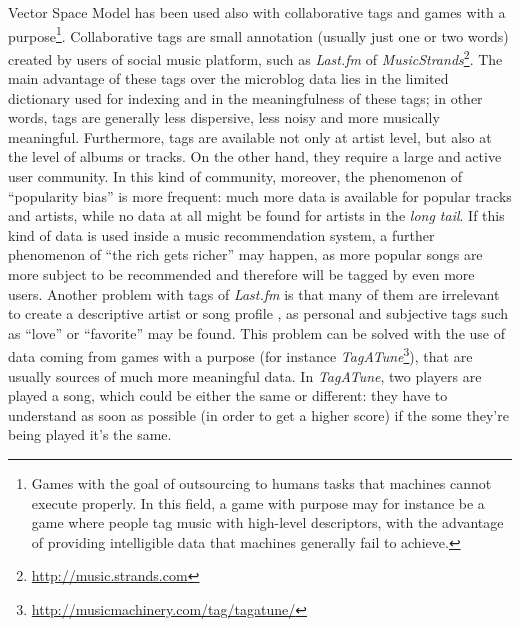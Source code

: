 Vector Space Model has been used also with collaborative tags and games with a purpose\footnote{Games with the goal of outsourcing to humans tasks that machines cannot execute properly. In this field, a game with purpose may for instance be a game where people tag music with high-level descriptors, with the advantage of providing intelligible data that machines generally fail to achieve.}. Collaborative tags are small annotation (usually just one or two words) created by users of social music platform, such as \textit{Last.fm} of \textit{MusicStrands}\footnote{\url{http://music.strands.com}}. The main advantage of these tags over the microblog data lies in the limited dictionary used for indexing and in the meaningfulness of these tags; in other words, tags are generally less dispersive, less noisy and more musically meaningful. Furthermore, tags are available not only at artist level, but also at the level of albums or tracks. On the other hand, they require a large and active user community. In this kind of community, moreover, the phenomenon of ``popularity bias'' is more frequent: much more data is available for popular tracks and artists, while no data at all might be found for artists in the \textit{long tail}. If this kind of data is used inside a music recommendation system, a further phenomenon of ``the rich gets richer'' may happen, as more popular songs are more subject to be recommended and therefore will be tagged by even more users. Another problem with tags of \textit{Last.fm} is that many of them are irrelevant to create a descriptive artist or song profile \cite{gomez14}, as personal and subjective tags such as ``love'' or ``favorite'' may be found. This problem can be solved with the use of data coming from games with a purpose (for instance \textit{TagATune}\footnote{\url{http://musicmachinery.com/tag/tagatune/}}), that are usually sources of much more meaningful data. In \textit{TagATune}, two players are played a song, which could be either the same or different: they have to understand as soon as possible (in order to get a higher score) if the some they're being played it's the same. 

